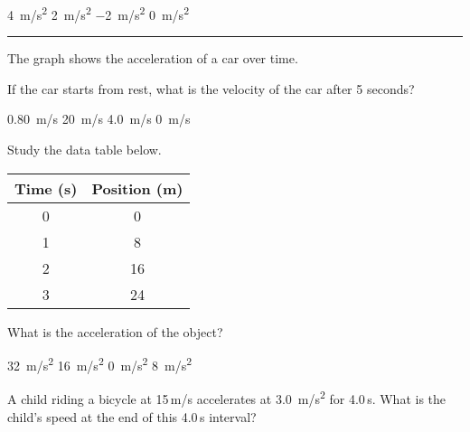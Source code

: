 \documentclass[../main-physics-problems.tex]{subfiles}
\begin{document}
\begin{questions}
\begin{randomizechoices}
    \correctchoice \SI{4}{m/s^2}
    \choice \SI{2}{m/s^2}
    \choice \SI{-2}{m/s^2}
    \choice \SI{0}{m/s^2}
\end{randomizechoices}

\bigskip
\hrule

\question
The graph shows the acceleration of a car over time. 

\begin{center}
\end{center}

If the car starts from rest, what is the velocity of the car after 5
seconds?

\begin{randomizechoices}
    \choice \SI{0.80}{m/s}
    \correctchoice \SI{20}{m/s}
    \choice \SI{4.0}{m/s}
    \choice \SI{0}{m/s}
\end{randomizechoices}

\question
Study the data table below.

\begin{center}
    \begin{tabular}{c|c}
        \textbf{Time} (s) & \textbf{Position} (m) \\ \hline
         0 & 0 \\
         1 & 8 \\
         2 & 16 \\
         3 & 24 \\
    \end{tabular}
\end{center}

What is the acceleration of the object?

\begin{randomizechoices}
 \choice \SI{32}{m/s^2}
 \choice \SI{16}{m/s^2}
 \correctchoice \SI{0}{m/s^2}
 \choice \SI{8}{m/s^2}
\end{randomizechoices}

\question 
A child riding a bicycle at 15\,m/s accelerates at \SI{3.0}{m/s^2} for 4.0\,s. What is the child's speed at the end of this 4.0\,s
interval?


\end{questions}
\end{document}
